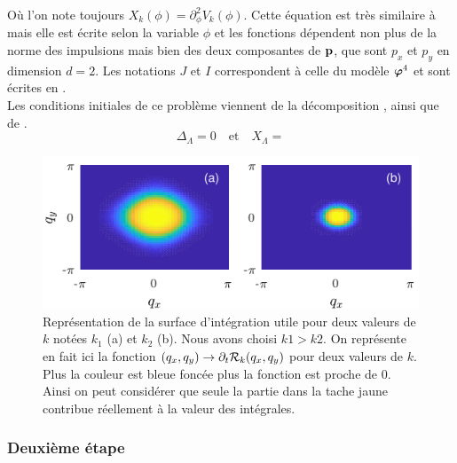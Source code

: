 \documentclass[10pt]{article}
\begin{document}
\begin{multicols}{2}
Où l'on note toujours $X_k(\phi) = \partial_{\phi}^2 V_k(\phi)$. Cette équation est très similaire à  mais elle est écrite selon la variable $\phi$ et les fonctions dépendent non plus de la norme des impulsions mais bien des deux composantes de ${\bf p}$, que sont $p_x$ et $p_y$ en dimension $d=2$. Les notations $J$ et $I$ correspondent à celle du modèle $\boldsymbol{ \varphi}^4$ et sont écrites en . \\


Les conditions initiales de ce problème viennent de la décomposition , ainsi que de .
\begin{equation}
	\Delta_\Lambda = 0 \quad \text{et} \quad X_\Lambda =  
\end{equation}


\begin{figure}[H]
\begin{center}
	\includegraphics[width=0.95\columnwidth]{DerRegIsing.pdf}
\end{center}
\caption{Représentation de la surface d'intégration utile pour deux valeurs de $k$ notées $k_1$ (a) et $k_2$ (b). Nous avons choisi $k1>k2$. On représente en fait ici la fonction $(q_x, q_y) \to \partial_t \mathcal{R}_k(q_x, q_y)$ pour deux valeurs de $k$. Plus la couleur est bleue foncée plus la fonction est proche de 0. Ainsi on peut considérer que seule la partie dans la tache jaune contribue réellement à la valeur des intégrales.}
\label{fig:DerRegIsing}
\end{figure}

\subsubsection{Deuxième étape}



\end{multicols}
\end{document}
